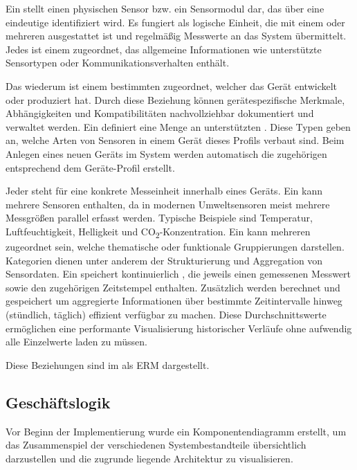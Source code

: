 	Ein  stellt einen physischen Sensor bzw. ein Sensormodul dar,
	das über eine eindeutige  identifiziert wird.
	Es fungiert als logische Einheit, die mit einem oder mehreren  ausgestattet ist
	und regelmäßig Messwerte an das System übermittelt. Jedes  ist einem  zugeordnet,
	das allgemeine Informationen wie unterstützte Sensortypen oder Kommunikationsverhalten enthält.

	Das  wiederum ist einem bestimmten  zugeordnet,
	welcher das Gerät entwickelt oder produziert hat. Durch diese Beziehung können gerätespezifische Merkmale,
	Abhängigkeiten und Kompatibilitäten nachvollziehbar dokumentiert und verwaltet werden.
	Ein  definiert eine Menge an unterstützten .
	Diese Typen geben an, welche Arten von Sensoren in einem Gerät dieses Profils verbaut sind.
	Beim Anlegen eines neuen Geräts im System werden automatisch die zugehörigen  entsprechend dem Geräte-Profil erstellt.

	Jeder  steht für eine konkrete Messeinheit innerhalb eines Geräts.
	Ein  kann mehrere Sensoren enthalten, da in modernen Umweltsensoren meist mehrere Messgrößen parallel erfasst werden.
	Typische Beispiele sind Temperatur, Luftfeuchtigkeit, Helligkeit und CO\textsubscript{2}-Konzentration.
	Ein  kann mehreren  zugeordnet sein, welche thematische oder funktionale Gruppierungen darstellen.
	Kategorien dienen unter anderem der Strukturierung und Aggregation von Sensordaten.
	Ein  speichert kontinuierlich , die jeweils einen gemessenen Messwert sowie den zugehörigen Zeitstempel enthalten.
	Zusätzlich werden  berechnet und gespeichert
	um aggregierte Informationen über bestimmte Zeitintervalle hinweg (\zB stündlich, täglich) effizient verfügbar zu machen.
	Diese Durchschnittswerte ermöglichen eine performante Visualisierung historischer Verläufe ohne aufwendig alle Einzelwerte laden zu müssen.
	
	Diese Beziehungen sind im  als \ac{ERM} dargestellt.


\subsection{Geschäftslogik}
\label{sec:Geschaeftslogik}
	Vor Beginn der Implementierung wurde ein Komponentendiagramm erstellt, um das Zusammenspiel der verschiedenen Systembestandteile
	übersichtlich darzustellen und die zugrunde liegende Architektur zu visualisieren.

